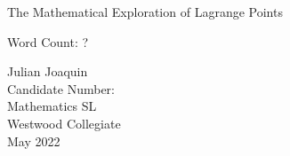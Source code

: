 \begin{titlepage}
	\begin{center}
		\vspace*{\fill}
		
		The Mathematical Exploration of Lagrange Points
		
		\vspace*{1.0cm}
		Word Count: ?
		
		\vfill
		
		Julian Joaquin\\
		Candidate Number: \\
		Mathematics SL \\
		Westwood Collegiate \\
		May 2022
		
		\vspace*{\fill}
		
	\end{center}
\end{titlepage}